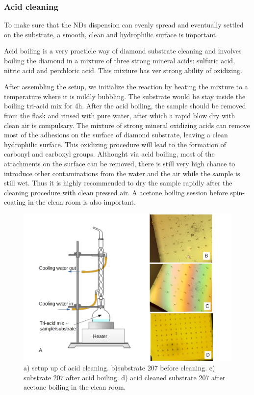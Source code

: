 \subsubsection{Acid cleaning}
To make sure that the NDs dispension can evenly spread and eventually settled on the substrate, a smooth, clean and hydrophilic surface is important.

Acid boiling is a very practicle way of diamond substrate cleaning and involves boiling the diamond in a mixture of three strong mineral acids: sulfuric acid, nitric acid and perchloric acid. This mixture has ver strong ability of oxidizing.

After assembling the setup, we initialize the reaction by heating the mixture to a temperature where it is mildly bubbling. The substrate would be stay inside the boiling tri-acid mix for 4h. After the acid boiling, the sample should be removed from the flask and rinsed with pure water, after which a rapid blow dry with clean air is compulsary.
The mixture of strong mineral oxidizing acids can remove most of the adhesions on the surface of diamond substrate, leaving a clean hydrophilic surface. This oxidizing procedure will lead to the formation of carbonyl and carboxyl groups.
Althought via acid boiling, most of the attachments on the surface can be removed, there is still very high chance to introduce other contaminations from the water and the air while the sample is still wet. Thus it is highly recommended to dry the sample rapidly after the cleaning procedure with clean pressed air. A acetone boiling session before spin-coating in the clean room is also important.

\begin{figure}[h]
	\centering
	\includegraphics[width=1\linewidth]{Figures/pic/AcidCleaning}
	\caption{a) setup up of acid cleaning. b)substrate 207 before cleaning. c) substrate 207 after acid boiling. d) acid cleaned substrate 207 after acetone boiling in the clean room.}
	\label{fig:Acid Cleaning}
\end{figure}

